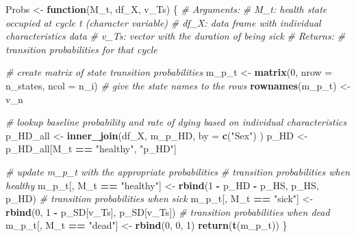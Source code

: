 \documentclass[
]{article}
\newenvironment{Shaded}{\begin{snugshade}}{\end{snugshade}}
\newcommand{\CommentTok}[1]{\textcolor[rgb]{0.56,0.35,0.01}{\textit{#1}}}
\newcommand{\ControlFlowTok}[1]{\textcolor[rgb]{0.13,0.29,0.53}{\textbf{#1}}}
\newcommand{\DataTypeTok}[1]{\textcolor[rgb]{0.13,0.29,0.53}{#1}}
\newcommand{\DecValTok}[1]{\textcolor[rgb]{0.00,0.00,0.81}{#1}}
\newcommand{\KeywordTok}[1]{\textcolor[rgb]{0.13,0.29,0.53}{\textbf{#1}}}
\newcommand{\NormalTok}[1]{#1}
\newcommand{\OperatorTok}[1]{\textcolor[rgb]{0.81,0.36,0.00}{\textbf{#1}}}
\newcommand{\StringTok}[1]{\textcolor[rgb]{0.31,0.60,0.02}{#1}}
\begin{document}
\begin{Shaded}
\begin{Highlighting}[]
\NormalTok{Probs <-}\StringTok{ }\ControlFlowTok{function}\NormalTok{(M_t, df_X, v_Ts) \{ }
  \CommentTok{# Arguments:}
    \CommentTok{# M_t: health state occupied at cycle t (character variable)}
    \CommentTok{# df_X: data frame with individual characteristics data }
    \CommentTok{# v_Ts: vector with the duration of being sick}
  \CommentTok{# Returns: }
    \CommentTok{# transition probabilities for that cycle}
  
  \CommentTok{# create matrix of state transition probabilities}
\NormalTok{  m_p_t           <-}\StringTok{ }\KeywordTok{matrix}\NormalTok{(}\DecValTok{0}\NormalTok{, }\DataTypeTok{nrow =}\NormalTok{ n_states, }\DataTypeTok{ncol =}\NormalTok{ n_i)  }
  \CommentTok{# give the state names to the rows}
  \KeywordTok{rownames}\NormalTok{(m_p_t) <-}\StringTok{  }\NormalTok{v_n                               }
  
  \CommentTok{# lookup baseline probability and rate of dying based on individual characteristics}
\NormalTok{  p_HD_all <-}\StringTok{ }\KeywordTok{inner_join}\NormalTok{(df_X, m_p_HD, }\DataTypeTok{by =} \KeywordTok{c}\NormalTok{(}\StringTok{"Sex"}\NormalTok{) )}
\NormalTok{  p_HD     <-}\StringTok{ }\NormalTok{p_HD_all[M_t }\OperatorTok{==}\StringTok{ "healthy"}\NormalTok{, }\StringTok{"p_HD"}\NormalTok{]}
  
  \CommentTok{# update m_p_t with the appropriate probabilities   }
  \CommentTok{# transition probabilities when healthy}
\NormalTok{  m_p_t[, M_t }\OperatorTok{==}\StringTok{ "healthy"}\NormalTok{] <-}\StringTok{ }\KeywordTok{rbind}\NormalTok{(}\DecValTok{1} \OperatorTok{-}\StringTok{ }\NormalTok{p_HD }\OperatorTok{-}\StringTok{ }\NormalTok{p_HS, p_HS, p_HD)    }
  \CommentTok{# transition probabilities when sick }
\NormalTok{  m_p_t[, M_t }\OperatorTok{==}\StringTok{ "sick"}\NormalTok{]    <-}\StringTok{ }\KeywordTok{rbind}\NormalTok{(}\DecValTok{0}\NormalTok{, }\DecValTok{1} \OperatorTok{-}\StringTok{ }\NormalTok{p_SD[v_Ts], p_SD[v_Ts])  }
  \CommentTok{# transition probabilities when dead     }
\NormalTok{  m_p_t[, M_t }\OperatorTok{==}\StringTok{ "dead"}\NormalTok{]    <-}\StringTok{ }\KeywordTok{rbind}\NormalTok{(}\DecValTok{0}\NormalTok{, }\DecValTok{0}\NormalTok{, }\DecValTok{1}\NormalTok{)                            }
  \KeywordTok{return}\NormalTok{(}\KeywordTok{t}\NormalTok{(m_p_t))}
\NormalTok{\}       }
\end{Highlighting}
\end{Shaded}
\end{document}

